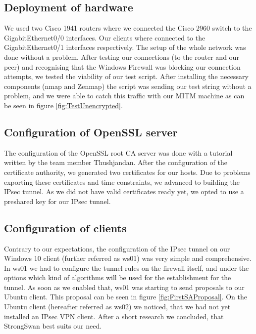 \documentclass[a4paper]{report}
\begin{document}
\subsection{Deployment of hardware}
We used two Cisco 1941 routers where we connected the Cisco 2960 switch to the GigabitEthernet0/0 interfaces. Our clients where connected to the GigabitEthernet0/1 interfaces respectively. The setup of the whole network was done without a problem. After testing our connections (to the router and our peer) and recognising that the Windows Firewall was blocking our connection attempts, we tested the viability of our test script. After installing the necessary components (nmap and Zenmap) the script was sending our test string without a problem, and we were able to catch this traffic with our MITM machine as can be seen in figure \ref{fig:TestUnencrypted}. 

\subsection{Configuration of OpenSSL server}

The configuration of the OpenSSL root CA server was done with a tutorial written by the team member Thushjandan.
After the configuration of the certificate authority, we generated two certificates for our hosts. Due to problems exporting these certificates and time constraints, we advanced to building the IPsec tunnel. As we did not have valid certificates ready yet, we opted to use a preshared key for our IPsec tunnel.

\subsection{Configuration of clients}

Contrary to our expectations, the configuration of the IPsec tunnel on our Windows 10 client (further referred as ws01) was very simple and comprehensive. In ws01 we had to configure the tunnel rules on the firewall itself, and under the options which kind of algorithms will be used for the establishment for the tunnel. As soon as we enabled that, ws01 was starting to send proposals to our Ubuntu client. This proposal can be seen in figure \ref{fig:FirstSAProposal}.
On the Ubuntu client (hereafter referred as ws02) we noticed, that we had not yet installed an IPsec VPN client. After a short research we concluded, that StrongSwan best suits our need.
\end{document}
